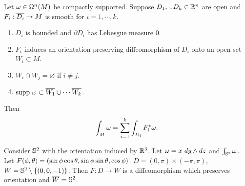 \begin{proposition}\label{16.8}
    Let $\omg \in \Omg^n(M)$ be compactly supported. Suppose $D_1,\cdot,D_k \in \R^n$ are open and $F_i:\cl{D_i} \to M$ is smooth for $i=1,\cdots,k$. 
    \begin{enumerate}
    \item $D_i$ is bounded and $\partial D_i$ has Lebesgue measure $0$. 
    \item $F_i$ induces an orientation-preserving diffeomorphism of $D_i$ onto an open set $W_i \subset M$. 
    \item $W_i \cap W_j = \varnothing$ if $i \neq j$. 
    \item $\supp \omg \subset \cl{W_1} \cup \cdots \cl{W_k}$. 
    \end{enumerate}
    Then $$\int_M \omg = \Sum{i=1}{k}\int_{D_i}F_i^* \omg. $$
\end{proposition}
\begin{example}
    Consider $\S^2$ with the orientation induced by $\R^3$. Let $\omg = x~dy \wedge dz$ and $\int_{\S^2} \omg$. Let $F(\phi, \cta) = (\sin\phi \cos\cta, \sin\phi\sin\cta, \cos\phi)$. $D=(0,\pi) \times (-\pi,\pi)$, $W = \S^2 \setminus \{(0,0,-1)\}$. Then $F:D \to W$ is a diffeomorphism which preserves orientation and $\cl{W} = \S^2$. 
\end{example}